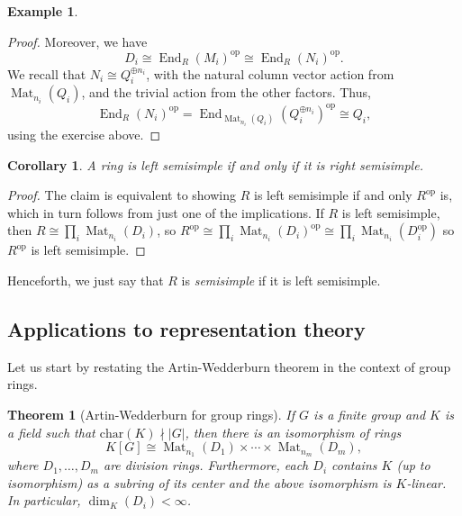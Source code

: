 \documentclass{amsart}[12pt]
\def\End{\operatorname{End}}
\def\Mat{\operatorname{Mat}}
\newcommand{\op}{\mathrm{op}}
\newcommand{\DEF}[1]{\emph{#1}\index{#1}}
\numberwithin{equation}{section}
\theoremstyle{plain} %
\newtheorem{thm}[equation]{Theorem}
\newtheorem{cor}[equation]{Corollary}
\theoremstyle{definition}
\newtheorem{ex}[equation]{Example}
\theoremstyle{remark}
\newcommand{\ssec}[1]{\subsection{#1}}
\begin{document}
\begin{ex}
\begin{proof}
Moreover, we have
\[
D_i\cong  \End_R(M_i)^{\op} \cong  \End_R(N_i)^{\op}. \]
We recall that $N_i\cong Q_i^{\oplus n_i}$, with the natural column vector action from $\Mat_{n_i}(Q_i)$, and the trivial action from the other factors. Thus,
\[  \End_R(N_i)^{\op} = \End_{\Mat_{n_i}(Q_i)} (Q_i^{\oplus n_i}) ^{\op}\cong Q_i,\]
using the exercise above.
\end{proof}



\begin{cor} A ring is left semisimple if and only if it is right semisimple.\end{cor}
\begin{proof} The claim is equivalent to showing $R$ is left semisimple if and only $R^\op$ is, which in turn follows from just one of the implications. If $R$ is left semisimple, then $R\cong \prod_{i} \Mat_{n_i}(D_i) $, so $R^{\op} \cong \prod_i \Mat_{n_i}(D_i)^{\op} \cong \prod_i \Mat_{n_i}(D_i^{\op})$ so $R^{\op}$ is left semisimple.
\end{proof}

Henceforth, we just say that $R$ is \DEF{semisimple} if it is left semisimple.

\ssec{Applications to representation theory}

Let us start by restating the Artin-Wedderburn theorem in the context of group rings.


\begin{thm}[Artin-Wedderburn for group rings] \label{cor919} If $G$ is a finite group and $K$ is a field such that $\mathrm{char}(K) \nmid |G|$, then
there is an isomorphism of rings
$$
K[G] \cong \Mat_{n_1}(D_1) \times \cdots \times \Mat_{n_m}(D_m),
$$
where $D_1, \dots, D_m$ are division rings. Furthermore,
each $D_i$ contains $K$ (up to isomorphism) as a subring of its center and the above isomorphism is $K$-linear. In particular,
$\dim_K(D_i) < \infty$. 


\end{thm}
\end{ex}
\end{document}
